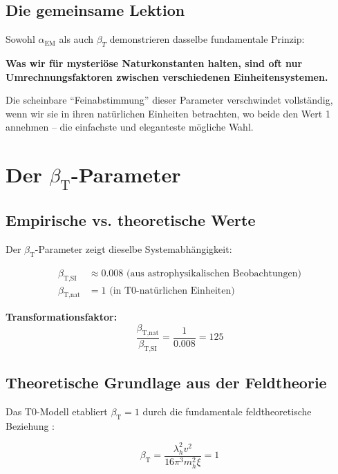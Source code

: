 \documentclass[12pt,a4paper]{article}
\newcommand{\xipar}{\xi}
\newcommand{\lambdah}{\lambda_h}
\newcommand{\pichar}{\pi}
\newcommand{\betaTSI}{\beta_{\text{T,SI}}}
\newcommand{\betaTnat}{\beta_{\text{T,nat}}}
\begin{document}
\subsection{Die gemeinsame Lektion}
\label{subsec:common_lesson}

Sowohl $\alpha_{\text{EM}}$ als auch $\beta_T$ demonstrieren dasselbe fundamentale Prinzip:

\textbf{Was wir für mysteriöse Naturkonstanten halten, sind oft nur Umrechnungsfaktoren zwischen verschiedenen Einheitensystemen.}

Die scheinbare ``Feinabstimmung'' dieser Parameter verschwindet vollständig, wenn wir sie in ihren natürlichen Einheiten betrachten, wo beide den Wert 1 annehmen -- die einfachste und eleganteste mögliche Wahl.
	\section{Der $\beta_{\text{T}}$-Parameter}
	\label{sec:beta_t}
	
	\subsection{Empirische vs. theoretische Werte}
	\label{subsec:beta_empirisch_theoretisch}
	
	Der $\beta_{\text{T}}$-Parameter zeigt dieselbe Systemabhängigkeit:
	
	\begin{align}
		\betaTSI &\approx 0.008 \text{ (aus astrophysikalischen Beobachtungen)} \\
		\betaTnat &= 1 \text{ (in T0-natürlichen Einheiten)}
	\end{align}
	
	\textbf{Transformationsfaktor:}
	$$\frac{\betaTnat}{\betaTSI} = \frac{1}{0.008} = 125$$
	
	\subsection{Theoretische Grundlage aus der Feldtheorie}
	\label{subsec:beta_feldtheorie}
	
	Das T0-Modell etabliert $\beta_{\text{T}} = 1$ durch die fundamentale feldtheoretische Beziehung \cite{pascher_derivation_beta_2025}:
	
	\begin{equation}
		\beta_{\text{T}} = \frac{\lambdah^2 v^2}{16\pichar^3 m_h^2 \xipar} = 1
		\label{eq:beta_t_feldtheorie}
	\end{equation}
	
\end{document}
